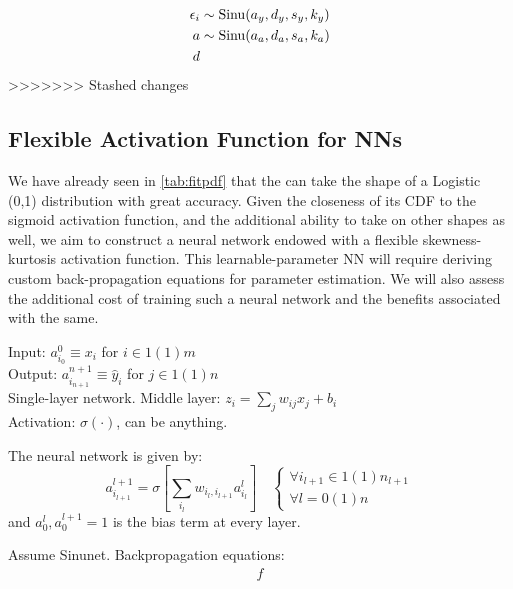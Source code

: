 \begin{align*}
	\epsilon_i &\sim \operatorname*{Sinu}(a_y,d_y,s_y,k_y)\\
	a &\sim \operatorname*{Sinu}(a_a, d_a, s_a, k_a)\\
	d
\end{align*}
>>>>>>> Stashed changes

\subsection{Flexible Activation Function for NNs}
We have already seen in \autoref{tab:fitpdf} that the \sindist{} can take the shape of a Logistic (0,1) distribution with great accuracy. Given the closeness of its CDF to the sigmoid activation function, and the additional ability to take on other shapes as well, we aim to construct a neural network endowed with a flexible skewness-kurtosis activation function. This learnable-parameter NN will require deriving custom back-propagation equations for parameter estimation. We will also assess the additional cost of training such a neural network and the benefits associated with the same.

Input: $a^0_{i_0} \equiv x_i$ for $i \in 1(1)m$\\
Output: $a^{n+1}_{i_{n+1}} \equiv \hat y_i$ for $j \in 1(1)n$\\
Single-layer network. Middle layer: $z_i = \sum_j w_{ij} x_j + b_i$\\
Activation: $\sigma(\cdot)$, can be anything.

The neural network is given by:
$$a^{l+1}_{i_{l+1}} = \sigma\left[\sum_{i_l} w_{i_l,i_{l+1}} a^l_{i_l}\right] \quad \begin{cases}
	\forall i_{l+1} \in 1(1)n_{l+1}\\
	\forall l = 0(1)n
\end{cases}$$
and $a^l_0, a^{l+1}_0 = 1$ is the bias term at every layer.

Assume Sinunet. Backpropagation equations:
\begin{align}
	f
\end{align}